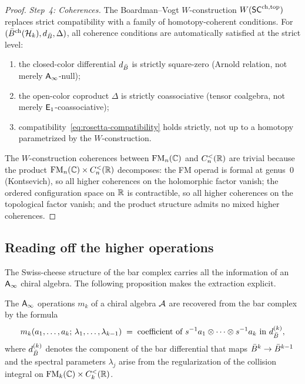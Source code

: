 \begin{proof}
\medskip
\noindent\textit{Step~4: Coherences.}\enspace
The Boardman--Vogt $W$-construction
$W(\mathsf{SC}^{\mathrm{ch,top}})$ replaces strict compatibility with a family of
homotopy-coherent conditions.  For $(\bar{B}^{\mathrm{ch}}(\mathcal{H}_k),
d_{\bar{B}}, \Delta)$, all coherence conditions are automatically
satisfied at the strict level:
\begin{enumerate}[label=(\alph*)]
\item the closed-color differential $d_{\bar{B}}$ is strictly
  square-zero (Arnold relation, not merely $\mathsf{A}_{\infty}$-null);
\item the open-color coproduct $\Delta$ is strictly coassociative
  (tensor coalgebra, not merely $\mathsf{E}_1$-coassociative);
\item compatibility~\eqref{eq:rosetta-compatibility} holds strictly,
  not up to a homotopy parametrized by the $W$-construction.
\end{enumerate}
The $W$-construction coherences between $\mathrm{FM}_n(\mathbb{C})$ and
$C_n^{<}(\mathbb{R})$ are trivial because the product
$\mathrm{FM}_n(\mathbb{C}) \times C_n^{<}(\mathbb{R})$ decomposes: the FM operad is
formal at genus~$0$ (Kontsevich), so all higher coherences on the
holomorphic factor vanish; the ordered configuration space on $\mathbb{R}$
is contractible, so all higher coherences on the topological factor
vanish; and the product structure admits no mixed higher coherences.
\end{proof}


\subsection{Reading off the higher operations}
\label{subsec:rosetta-operations}

The Swiss-cheese structure of the bar complex carries all the
information of an $\mathsf{A}_{\infty}$ chiral algebra.  The following
proposition makes the extraction explicit.

\begin{proposition}
\label{prop:rosetta-operations}
The $\mathsf{A}_{\infty}$ operations $m_k$ of a chiral algebra $\mathcal{A}$ are
recovered from the bar complex by the formula
\begin{equation}\label{eq:rosetta-mk-extraction}
m_k(a_1, \ldots, a_k;\, \lambda_1, \ldots, \lambda_{k-1})
\;=\;
\text{coefficient of }
s^{-1}a_1 \otimes \cdots \otimes s^{-1}a_k
\text{ in }
d_{\bar{B}}^{(k)},
\end{equation}
where $d_{\bar{B}}^{(k)}$ denotes the component of the bar
differential that maps $\bar{B}^k \to \bar{B}^{k-1}$ and the
spectral parameters $\lambda_j$ arise from the regularization
of the collision integral on $\mathrm{FM}_k(\mathbb{C}) \times C_k^{<}(\mathbb{R})$.
\end{proposition}


